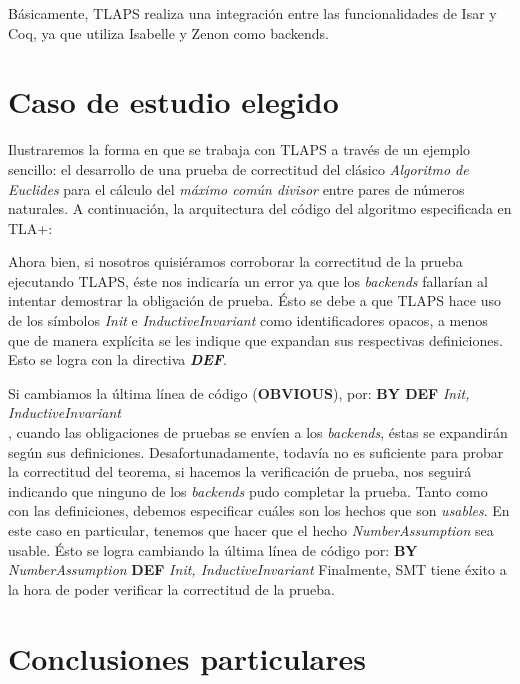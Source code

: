 \documentclass[spanish]{llncs}
\begin{document}
  Básicamente, TLAPS realiza una integración entre las funcionalidades de  Isar y Coq, ya que utiliza Isabelle y Zenon como backends.



\section{Caso de estudio elegido}

Ilustraremos la forma en que se trabaja con TLAPS a través de un ejemplo sencillo\cite{example}: 
el desarrollo de una prueba de correctitud del clásico \textit{Algoritmo de Euclides} para el cálculo del \textit{máximo común divisor} entre pares de números naturales.
A continuación, la arquitectura del código del algoritmo especificada en TLA+:\newpage
  
  
Ahora bien, si nosotros quisiéramos corroborar la correctitud de la prueba ejecutando TLAPS, éste nos indicaría un error ya que los \textit{backends} fallarían al intentar demostrar la obligación de prueba. Ésto se debe a que TLAPS
hace uso de los símbolos \textit{Init} e \textit{InductiveInvariant} como identificadores opacos, a menos que de manera explícita se les indique que expandan sus respectivas definiciones. Esto se logra con la directiva \textbf{\textit{DEF}}. 

\newpage
Si cambiamos la última línea de código (\textbf{OBVIOUS}), por:
\subitem \textbf{BY DEF} \textit{Init, InductiveInvariant}\\
, cuando las obligaciones de pruebas se envíen a los \textit{backends}, éstas se expandirán según sus definiciones. Desafortunadamente, todavía no es suficiente para probar la correctitud del teorema, si hacemos la verificación de prueba, nos seguirá indicando que ninguno de los \textit{backends} pudo completar la prueba.
Tanto como con las definiciones, debemos especificar cuáles son los hechos que son \textit{usables}. En este caso en particular, tenemos que hacer que el hecho \textit{NumberAssumption} sea usable. Ésto se logra cambiando la última línea de código por:
\subitem \textbf{BY} \textit{NumberAssumption} \textbf{DEF} \textit{Init, InductiveInvariant}
Finalmente, SMT tiene éxito a la hora de poder verificar la correctitud de la prueba.


\section{Conclusiones particulares}
\end{document}
